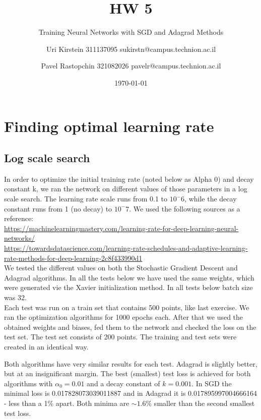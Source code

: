 \documentclass[12pt]{scrartcl}
\begin{document}

\titlehead{CS department, Technion}
\subject{Introduction to Optimization and Deep Learning 236330}
\title{HW 5}
\subtitle{Training Neural Networks with SGD and Adagrad Methods}
\author{Uri Kirstein 311137095 \hfill sukirstn@campus.technion.ac.il\and Pavel Rastopchin 321082026 pavelr@campus.technion.ac.il}
\date{\today}
\maketitle


\section{Finding optimal learning rate}
\subsection{Log scale search}
In order to optimize the initial training rate (noted below as Alpha 0) and decay constant k, we ran the network on different values of those parameters in a log scale search. The learning rate scale runs from 0.1 to $10^-6$, while the decay constant runs from 1 (no decay) to $10^-7$. We used the following sources as a reference:\\
\url{https://machinelearningmastery.com/learning-rate-for-deep-learning-neural-networks/}\\
\url{https://towardsdatascience.com/learning-rate-schedules-and-adaptive-learning-rate-methods-for-deep-learning-2c8f433990d1}\\
We tested the different values on both the Stochastic Gradient Descent and Adagrad algorithms. In all the tests below we have used the same weights, which were generated vie the Xavier initialization method. In all tests below batch size was 32.\\
Each test was run on a train set that contains 500 points, like last exercise. We ran the optimization algorithms for 1000 epochs each. After that we used the obtained weights and biases, fed them to the network and checked the loss on the test set. The test set consists of 200 points. The training and test sets were created in an identical way.



Both algorithms have very similar results for each test. Adagrad is slightly better, but at an insignificant margin. The best (smallest) test loss is achieved for both algorithms with $\alpha_0 = 0.01$ and a decay constant of $k=0.001$. In SGD the minimal loss is 0.017828073039011887 and in Adagrad it is 0.017895997004666164 - less than a 1\% apart. Both minima are $\sim 1.6\%$ smaller than the second smallest test loss.\\
\end{document}
